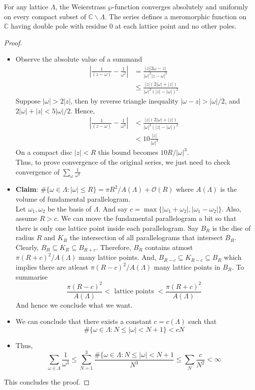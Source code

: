 \documentclass[oneside, 12pt]{scrbook}
\newcommand{\CC}{\mathbb C}
\newcommand{\bs}{\backslash}
\newcommand{\ds}{\displaystyle}
\theoremstyle{theorem}
\begin{document}
\begin{theorem}
For any lattice $\Lambda$, the Weierstrass $\wp$-function converges absolutely and uniformly on every compact subset of $\CC\bs \Lambda$. The series defines a meromorphic function on $\CC$ having double pole with residue $0$ at each lattice point and no other poles.
\end{theorem}

\begin{proof}
\begin{itemize}
\item Observe the absolute value of a summand 
\begin{align*}
\left|\frac{1}{(z-\omega)}  - \frac{1}{\omega^2}\right| &= \frac{|z||2\omega - z|}{|\omega|^2 |z - \omega|^2} \\
&\le \frac{|z|(2 |\omega| + |z|)}{|\omega|^2(|z| -|\omega|)^2} 
\end{align*}
Suppose $|\omega| > 2|z|$, then by reverse triangle inequality $|\omega - z| > |\omega|/2$, and $2|\omega| + |z| < 5|\omega|/2$. Hence, 
\begin{align*}
\left|\frac{1}{(z-\omega)}  - \frac{1}{\omega^2}\right| &< \frac{|z|(2 |\omega| + |z|)}{|\omega|^2(|z| -|\omega|)^2} \\
&< 10\frac{|z|}{|\omega|^3}
\end{align*}
On a compact disc $|z|<R$ this bound becomes $10R/|\omega|^3$. \\

Thus, to prove convergence of the original series, we just need to check convergence of $\ds{\sum_{\omega} \frac{1}{\omega^3}}$
\item \textbf{Claim}: $\#\{\omega \in \Lambda : |\omega| \le R\} = \pi R^2/A(\Lambda) + \mathcal{O}(R)$ where $A(\Lambda)$ is the volume of fundamental parallelogram. \\
Let $\omega_{1},\omega_{2}$ be the basis of $\Lambda$. And say $c = \max\{|\omega_{1} + \omega_{2}|, |\omega_{1} - \omega_{2}|\}$. Also, assume $R>c$. We can move the fundamental parallelogram a bit so that there is only one lattice point inside each parallelogram. Say $B_{R}$ is the disc of radius $R$ and $K_{R}$ the intersection of all parallelograms that intersect $B_{R}$. Clearly, $B_{R} \subseteq K_{R} \subseteq B_{R+c}$. Therefore, $B_{R}$ contains atmost $\pi (R+c)^2/A(\Lambda)$ many lattice points. And, $B_{R-c} \subseteq K_{R-c} \subseteq B_{R}$ which implies there are atleast $\pi (R-c)^2/A(\Lambda)$ many lattice points in $B_{R}$. To summarise $$\frac{\pi (R-c)^2}{A(\Lambda)} < \text{ lattice points } < \frac{\pi (R+c)^2}{A(\Lambda)}$$ 
And hence we conclude what we want.
\item We can conclude that there exists a constant $c=c(\Lambda)$ such that $$\#\{\omega \in \Lambda : N \le |\omega|< N+1\} < cN$$
\item Thus, $$\sum_{\omega \in \Lambda} \frac{1}{\omega^3} \le \sum_{N=1}^3 \frac{\#\{\omega \in \Lambda : N \le |\omega|< N+1}{N^3}\le \sum_{N} \frac{c}{N^2}<\infty$$
\end{itemize}
This concludes the proof.
\end{proof}
\end{document}
